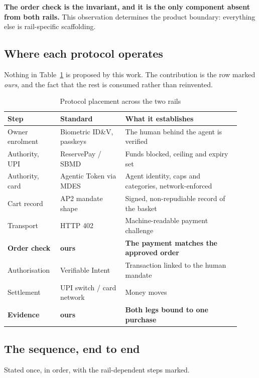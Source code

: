 \documentclass[journal,onecolumn,11pt]{IEEEtran}
\begin{document}
\textbf{The order check is the invariant, and it is the only component absent from
both rails.} This observation determines the product boundary: everything else is
rail-specific scaffolding.

\subsection{Where each protocol operates}\label{sec:protomap}
Nothing in Table~\ref{tab:protomap} is proposed by this work. The contribution is the
row marked \emph{ours}, and the fact that the rest is consumed rather than reinvented.

\begin{table}[t]
\centering
\caption{Protocol placement across the two rails}
\label{tab:protomap}
\begin{tabular}{@{}p{0.20\linewidth}p{0.26\linewidth}p{0.46\linewidth}@{}}
\toprule
\textbf{Step} & \textbf{Standard} & \textbf{What it establishes} \\
\midrule
Owner enrolment & Biometric ID\&V, passkeys & The human behind the agent is verified \\
Authority, UPI & ReservePay / SBMD~\cite{npci-228} & Funds blocked, ceiling and expiry set \\
Authority, card & Agentic Token via MDES & Agent identity, caps and categories, network-enforced \\
Cart record & AP2 mandate shape~\cite{ap2} & Signed, non-repudiable record of the basket \\
Transport & HTTP 402~\cite{p3p,mpp,x402} & Machine-readable payment challenge \\
\textbf{Order check} & \textbf{ours} & \textbf{The payment matches the approved order} \\
Authorisation & Verifiable Intent~\cite{mc-vi} & Transaction linked to the human mandate \\
Settlement & UPI switch / card network & Money moves \\
\textbf{Evidence} & \textbf{ours} & \textbf{Both legs bound to one purchase} \\
\bottomrule
\end{tabular}
\end{table}

\subsection{The sequence, end to end}\label{sec:seq}
Stated once, in order, with the rail-dependent steps marked.
\end{document}
